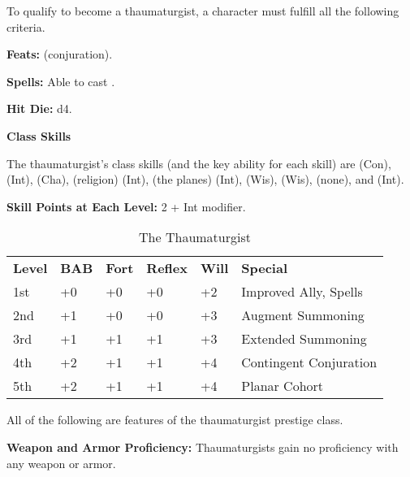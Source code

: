 
\Requirements

To qualify to become a thaumaturgist, a character must fulfill all the following 
criteria.

\textbf{Feats:}  (conjuration).

\textbf{Spells:} Able to cast .

\Basics

\textbf{Hit Die:} d4.

\textbf{Class Skills}

The thaumaturgist's class skills (and the key ability for each skill) are  
(Con),  (Int),  (Cha),  (religion) (Int),  (the 
planes) (Int),  (Wis),  (Wis),  (none), and 
 (Int).

\textbf{Skill Points at Each Level:} 2 + Int modifier.

\begin{table}[htb]
\caption{The Thaumaturgist}
\centering
\begin{tabular}{*{6}{l}}
\textbf{Level} & \textbf{BAB} & \textbf{Fort} & \textbf{Reflex} & \textbf{Will} & \textbf{Special}\\
1st & +0 & +0 & +0 & +2 & Improved Ally, Spells\\
2nd & +1 & +0 & +0 & +3 & Augment Summoning\\
3rd & +1 & +1 & +1 & +3 & Extended Summoning\\
4th & +2 & +1 & +1 & +4 & Contingent Conjuration\\
5th & +2 & +1 & +1 & +4 & Planar Cohort\\
\end{tabular}
\end{table}

\ClassFeatures

All of the following are features of the thaumaturgist prestige class.

\textbf{Weapon and Armor Proficiency:} Thaumaturgists gain no proficiency with 
any weapon or armor.

